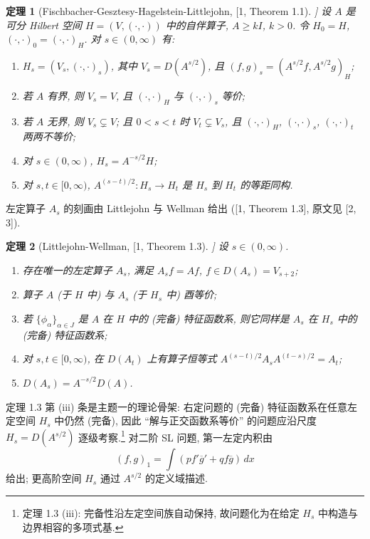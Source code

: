 \documentclass[UTF8]{ctexart}
\newtheorem{theorem}{定理}[section]
\begin{document}
\begin{theorem}[Fischbacher-Gesztesy-Hagelstein-Littlejohn, [1, Theorem 1.1]]
设 $A$ 是可分 Hilbert 空间 $H = (V, (\cdot, \cdot))$ 中的自伴算子, $A \geq kI$, $k > 0$.
令 $H_0 = H$, $(\cdot, \cdot)_0 = (\cdot, \cdot)_H$. 对 $s \in (0, \infty)$ 有:
\begin{enumerate}
	\item $H_s = (V_s, (\cdot, \cdot)_s)$, 其中 $V_s = D(A^{s/2})$,
		且 $(f, g)_s = (A^{s/2}f, A^{s/2}g)_H$;
	\item 若 $A$ 有界, 则 $V_s = V$, 且 $(\cdot, \cdot)_H$ 与 $(\cdot, \cdot)_s$ 等价;
	\item 若 $A$ 无界, 则 $V_s \subsetneq V$; 且 $0 < s < t$ 时 $V_t \subsetneq V_s$,
		且 $(\cdot, \cdot)_H$, $(\cdot, \cdot)_s$, $(\cdot, \cdot)_t$ 两两不等价;
	\item 对 $s \in (0, \infty)$, $H_s = A^{-s/2}H$;
	\item 对 $s, t \in [0, \infty)$, $A^{(s-t)/2}: H_s \to H_t$ 是 $H_s$ 到 $H_t$
		的等距同构.
\end{enumerate}
\end{theorem}

左定算子 $A_s$ 的刻画由 Littlejohn 与 Wellman 给出 ([1, Theorem 1.3], 原文见 [2, 3]).

\begin{theorem}[Littlejohn-Wellman, [1, Theorem 1.3]]
设 $s \in (0, \infty)$.
\begin{enumerate}
	\item 存在唯一的左定算子 $A_s$, 满足 $A_s f = Af$, $f \in D(A_s) = V_{s+2}$;
	\item 算子 $A$ (于 $H$ 中) 与 $A_s$ (于 $H_s$ 中) 酉等价;
	\item 若 $\{\phi_\alpha\}_{\alpha \in J}$ 是 $A$ 在 $H$ 中的 (完备) 特征函数系,
		则它同样是 $A_s$ 在 $H_s$ 中的 (完备) 特征函数系;
	\item 对 $s, t \in [0, \infty)$, 在 $D(A_t)$ 上有算子恒等式
		$A^{(s-t)/2} A_s A^{(t-s)/2} = A_t$;
	\item $D(A_s) = A^{-s/2} D(A)$.
\end{enumerate}
\end{theorem}

定理 1.3 第 (iii) 条是主题一的理论骨架: 右定问题的 (完备) 特征函数系在任意左定空间
$H_s$ 中仍然 (完备), 因此 ``解与正交函数系等价'' 的问题应沿尺度 $H_s = D(A^{s/2})$
逐级考察.\footnote{定理 1.3 (iii): 完备性沿左定空间族自动保持, 故问题化为在给定 $H_s$ 中构造与边界相容的多项式基.} 对二阶 SL 问题, 第一左定内积由
\begin{equation}
	(f, g)_1 = \int (p f' \overline{g}' + q f \overline{g}) \, dx
\end{equation}
给出; 更高阶空间 $H_s$ 通过 $A^{s/2}$ 的定义域描述.
\end{document}
